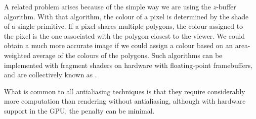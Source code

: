 \documentclass[../COS3712_Notes.tex]{subfiles}
\begin{document}
      A related problem arises because of the simple way we are using the $z$-buffer algorithm.
      With that algorithm, the colour of a pixel is determined by the shade of a single primitive.
      If a pixel shares multiple polygons, the colour assigned to the pixel is the one
      associated with the polygon closest to the viewer.
      We could obtain a much more accurate image if we could assign a colour based on an
      area-weighted average of the colours of the polygons.
      Such algorithms can be implemented with fragment shaders on hardware with
      floating-point framebuffers,
      and are collectively known as .

      What is common to all antialiasing techniques is that they require considerably
      more computation than rendering without antialiasing, although with hardware support
      in the GPU, the penalty can be minimal.

\end{document}
